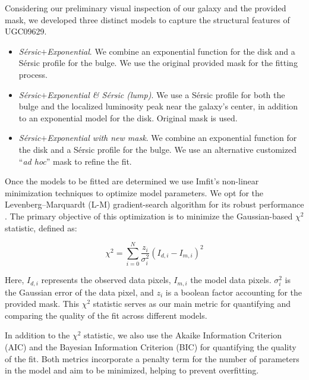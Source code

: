 Considering our preliminary visual inspection of our galaxy and the provided mask, we developed three distinct models to capture the structural features of UGC09629. 
\begin{itemize}
    \item \textit{Sérsic$+$Exponential}. We combine an exponential function for the disk and a S\'{e}rsic profile for the bulge. We use the original provided mask for the fitting process. 
    \item \textit{Sérsic$+$Exponential \& Sérsic (lump)}. We use a S\'{e}rsic profile for both the bulge and the localized luminosity peak near the galaxy's center, in addition to an exponential model for the disk. Original mask is used.
    \item \textit{Sérsic$+$Exponential with new mask}. We combine an exponential function for the disk and a S\'{e}rsic profile for the bulge. We use an alternative customized ``\textit{ad hoc}'' mask to refine the fit.
\end{itemize}


Once the models to be fitted are determined  we use Imfit's non-linear minimization techniques to optimize model parameters. We opt for the Levenberg--Marquardt (L-M) gradient-search algorithm for its robust performance \citep{levenberg1944method, marquardt1963algorithm}. The primary objective of this optimization
is to minimize the Gaussian-based \(\chi^2\) statistic, defined as:

\[
\chi^2 = \sum_{i=0}^{N} \frac{z_i}{\sigma^2_i} \left(I_{d,i} - I_{m,i}\right)^2
\]

Here, \(I_{d,i}\) represents the observed data pixels, \(I_{m,i}\) the model data pixels. \(\sigma_i^2\) is the Gaussian error of the data pixel, and $z_i$ is a boolean factor accounting for the provided mask. This \(\chi^2\) statistic serves as our main metric for quantifying and comparing the quality of the fit across different models.

In addition to the $\chi^2$ statistic, we also use the Akaike Information Criterion (AIC) \citep{akaike1998information} and the Bayesian Information Criterion (BIC) \citep{schwarz1978estimating} for quantifying the quality of the fit. Both metrics incorporate a penalty term for the number of parameters in the model and aim to be minimized, helping to prevent overfitting.

